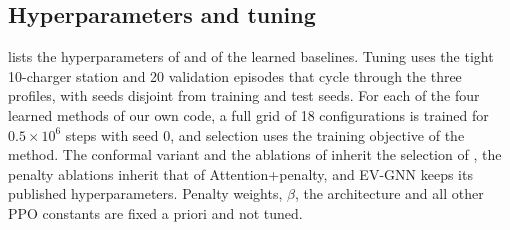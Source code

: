 \subsection{Hyperparameters and tuning}\label{app:hyper}

 lists the hyperparameters of \method{} and of the learned baselines.
Tuning uses the tight 10-charger station and 20 validation episodes that cycle through the three profiles, with seeds disjoint from training and test seeds.
For each of the four learned methods of our own code, a full grid of 18 configurations is trained for $0.5\times10^{6}$ steps with seed 0, and selection uses the training objective of the method.
The conformal variant and the ablations of \method{} inherit the selection of \method{}, the penalty ablations inherit that of Attention+penalty, and EV-GNN keeps its published hyperparameters.
Penalty weights, $\beta$, the architecture and all other PPO constants are fixed a priori and not tuned.

